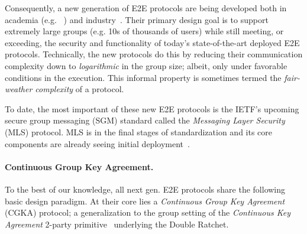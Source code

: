 Consequently, a new generation of E2E protocols are being developed both in
academia (e.g.~%
\cite{CCS:CCGMM18,EC:AlwCorDod19,TCC:ACJM20,EPRINT:AlwJosMul20,C:ACDT20,TCC:AABNKPPW21,SP:ACC+21})
and industry~\cite{MLS}. Their primary design goal is to support extremely
large groups (e.g. 10s of thousands of users) while still meeting, or
exceeding, the security and functionality of today's state-of-the-art
deployed E2E protocols. Technically, the new protocols do this by reducing
their communication complexity down to \emph{logarithmic} in the group size;
albeit, only under favorable conditions in the execution. This informal
property is sometimes termed the \emph{fair-weather complexity} of a
protocol.

To date, the most important of these new E2E protocols is the IETF's upcoming
secure group messaging (SGM) standard called the \emph{Messaging Layer
Security} (MLS) protocol.
MLS is in the final stages of standardization and its core
components are already seeing initial deployment~\cite{Cisco-Webex-MLS}.

\paragraph{Continuous Group Key Agreement.}
To the best of our knowledge, all next gen. E2E protocols share the following
basic design paradigm. At their core lies a \emph{Continuous Group Key
Agreement} (CGKA) protocol; a generalization to the group setting of the
\emph{Continuous Key Agreement} 2-party
primitive~\cite{EC:AlwCorDod19,CSCML:DG19} underlying the Double Ratchet.


